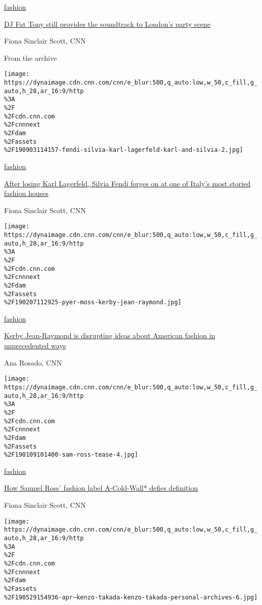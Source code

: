 \href{/style/fashion}{fashion}

\href{/style/article/dj-fat-tony-interview/index.html}{DJ Fat Tony still
provides the soundtrack to London's party scene}

Fiona Sinclair Scott, CNN

From the archive

\href{/style/article/silvia-fendi-documentary/index.html}{}

\texttt{[image: https://dynaimage.cdn.cnn.com/cnn/e\_blur:500,q\_auto:low,w\_50,c\_fill,g\_auto,h\_28,ar\_16:9/http\\\%3A\\\%2F\\\%2Fcdn.cnn.com\\\%2Fcnnnext\\\%2Fdam\\\%2Fassets\\\%2F190903114157-fendi-silvia-karl-lagerfeld-karl-and-silvia-2.jpg]}

\href{/style/fashion}{fashion}

\href{/style/article/silvia-fendi-documentary/index.html}{After losing
Karl Lagerfeld, Silvia Fendi forges on at one of Italy's most storied
fashion houses}

Fiona Sinclair Scott, CNN

\href{/style/article/pyer-moss-kerby-jean-raymond/index.html}{}

\texttt{[image: https://dynaimage.cdn.cnn.com/cnn/e\_blur:500,q\_auto:low,w\_50,c\_fill,g\_auto,h\_28,ar\_16:9/http\\\%3A\\\%2F\\\%2Fcdn.cnn.com\\\%2Fcnnnext\\\%2Fdam\\\%2Fassets\\\%2F190207112925-pyer-moss-kerby-jean-raymond.jpg]}

\href{/style/fashion}{fashion}

\href{/style/article/pyer-moss-kerby-jean-raymond/index.html}{Kerby
Jean-Raymond is disrupting ideas about American fashion in unprecedented
ways}

Ana Rosado, CNN

\href{/style/article/samuel-ross-a-cold-wall/index.html}{}

\texttt{[image: https://dynaimage.cdn.cnn.com/cnn/e\_blur:500,q\_auto:low,w\_50,c\_fill,g\_auto,h\_28,ar\_16:9/http\\\%3A\\\%2F\\\%2Fcdn.cnn.com\\\%2Fcnnnext\\\%2Fdam\\\%2Fassets\\\%2F190109101400-sam-ross-tease-4.jpg]}

\href{/style/fashion}{fashion}

\href{/style/article/samuel-ross-a-cold-wall/index.html}{How Samuel
Ross' fashion label A-Cold-Wall* defies definition}

Fiona Sinclair Scott, CNN

\href{/style/article/kenzo-takada-interview/index.html}{}

\texttt{[image: https://dynaimage.cdn.cnn.com/cnn/e\_blur:500,q\_auto:low,w\_50,c\_fill,g\_auto,h\_28,ar\_16:9/http\\\%3A\\\%2F\\\%2Fcdn.cnn.com\\\%2Fcnnnext\\\%2Fdam\\\%2Fassets\\\%2F190529154936-apr---kenzo-takada-kenzo-takada-personal-archives-6.jpg]}

